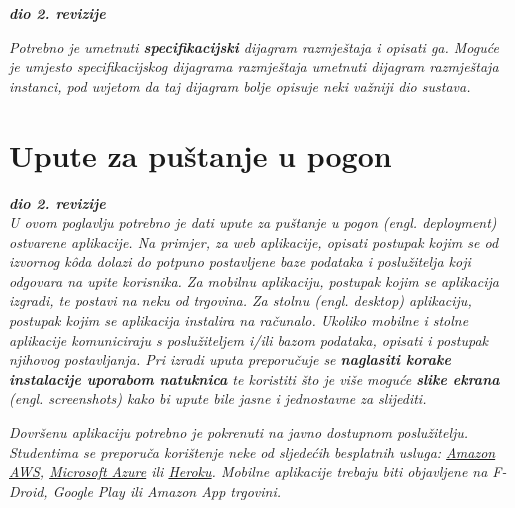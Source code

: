 			\textbf{\textit{dio 2. revizije}}
			
			 \textit{Potrebno je umetnuti \textbf{specifikacijski} dijagram razmještaja i opisati ga. Moguće je umjesto specifikacijskog dijagrama razmještaja umetnuti dijagram razmještaja instanci, pod uvjetom da taj dijagram bolje opisuje neki važniji dio sustava.}
			
			\eject 
		
		\section{Upute za puštanje u pogon}
		
			\textbf{\textit{dio 2. revizije}}\\
		
			 \textit{U ovom poglavlju potrebno je dati upute za puštanje u pogon (engl. deployment) ostvarene aplikacije. Na primjer, za web aplikacije, opisati postupak kojim se od izvornog kôda dolazi do potpuno postavljene baze podataka i poslužitelja koji odgovara na upite korisnika. Za mobilnu aplikaciju, postupak kojim se aplikacija izgradi, te postavi na neku od trgovina. Za stolnu (engl. desktop) aplikaciju, postupak kojim se aplikacija instalira na računalo. Ukoliko mobilne i stolne aplikacije komuniciraju s poslužiteljem i/ili bazom podataka, opisati i postupak njihovog postavljanja. Pri izradi uputa preporučuje se \textbf{naglasiti korake instalacije uporabom natuknica} te koristiti što je više moguće \textbf{slike ekrana} (engl. screenshots) kako bi upute bile jasne i jednostavne za slijediti.}
			
			
			 \textit{Dovršenu aplikaciju potrebno je pokrenuti na javno dostupnom poslužitelju. Studentima se preporuča korištenje neke od sljedećih besplatnih usluga: \href{https://aws.amazon.com/}{Amazon AWS}, \href{https://azure.microsoft.com/en-us/}{Microsoft Azure} ili \href{https://www.heroku.com/}{Heroku}. Mobilne aplikacije trebaju biti objavljene na F-Droid, Google Play ili Amazon App trgovini.}
			
			
			\eject 